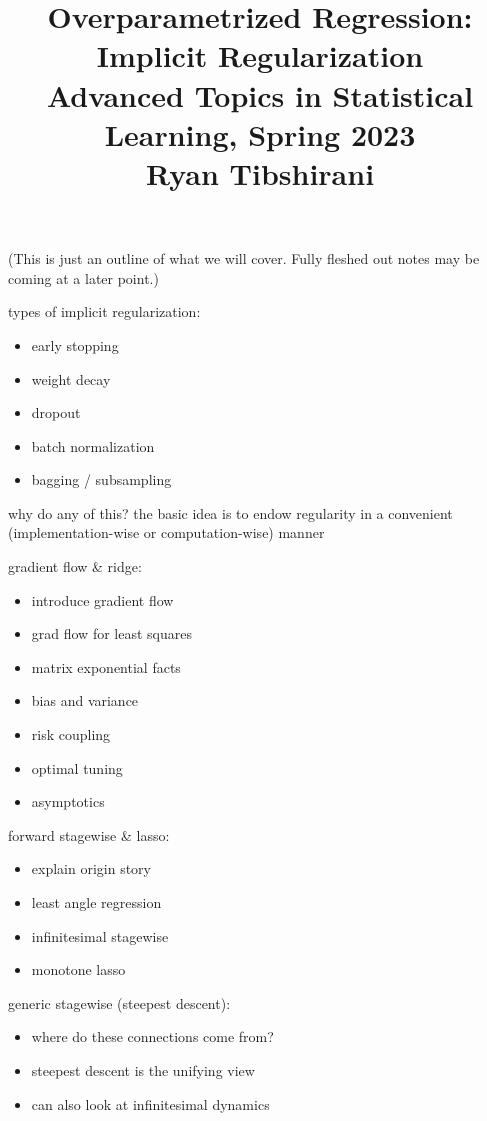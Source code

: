 \documentclass{article}
\title{Overparametrized Regression: Implicit Regularization \\ \smallskip
\large Advanced Topics in Statistical Learning, Spring 2023 \\ \smallskip
Ryan Tibshirani }
\date{}
\begin{document}
\maketitle
\RaggedRight
\vspace{-50pt}

(This is just an outline of what we will cover. Fully fleshed out notes may be
coming at a later point.)  


\bigskip
types of implicit regularization:

\begin{itemize}
\item early stopping 
\item weight decay 
\item dropout 
\item batch normalization 
\item bagging / subsampling
\end{itemize}

why do any of this? the basic idea is to endow regularity in a convenient
(implementation-wise or computation-wise) manner  

\bigskip
gradient flow \& ridge:

\begin{itemize}
\item introduce gradient flow 
\item grad flow for least squares 
\item matrix exponential facts
\item bias and variance 
\item risk coupling 
\item optimal tuning 
\item asymptotics
\end{itemize}

\bigskip 
forward stagewise \& lasso:

\begin{itemize}
\item explain origin story
\item least angle regression
\item infinitesimal stagewise 
\item monotone lasso
\end{itemize}

\bigskip 
generic stagewise (steepest descent):

\begin{itemize}
\item where do these connections come from?
\item steepest descent is the unifying view
\item can also look at infinitesimal dynamics
\end{itemize}
\end{document}

